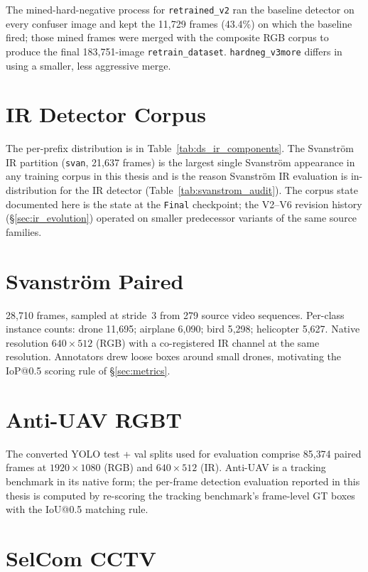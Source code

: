 \documentclass[12pt,a4paper,oneside,openright]{book}
\begin{document}
\noindent The mined-hard-negative process for \texttt{retrained\_v2} ran the baseline detector on every confuser image and kept the 11{,}729 frames (43.4\%) on which the baseline fired; those mined frames were merged with the composite RGB corpus to produce the final 183{,}751-image \texttt{retrain\_dataset}. \texttt{hardneg\_v3more} differs in using a smaller, less aggressive merge.

\section{IR Detector Corpus}

The per-prefix distribution is in Table~\ref{tab:ds_ir_components}. The Svanstr\"om IR partition (\texttt{svan}, 21{,}637 frames) is the largest single Svanstr\"om appearance in any training corpus in this thesis and is the reason Svanstr\"om IR evaluation is in-distribution for the IR detector (Table~\ref{tab:svanstrom_audit}). The corpus state documented here is the state at the \texttt{Final} checkpoint; the V2--V6 revision history (\S\ref{sec:ir_evolution}) operated on smaller predecessor variants of the same source families.

\section{Svanstr\"om Paired}

28{,}710 frames, sampled at stride~3 from 279 source video sequences. Per-class instance counts: drone 11{,}695; airplane 6{,}090; bird 5{,}298; helicopter 5{,}627. Native resolution $640{\times}512$ (RGB) with a co-registered IR channel at the same resolution. Annotators drew loose boxes around small drones, motivating the IoP@0.5 scoring rule of \S\ref{sec:metrics}.

\section{Anti-UAV RGBT}

The converted YOLO test + val splits used for evaluation comprise 85{,}374 paired frames at $1920{\times}1080$ (RGB) and $640{\times}512$ (IR). Anti-UAV is a tracking benchmark in its native form; the per-frame detection evaluation reported in this thesis is computed by re-scoring the tracking benchmark's frame-level GT boxes with the IoU@0.5 matching rule.

\section{SelCom CCTV}
\end{document}
